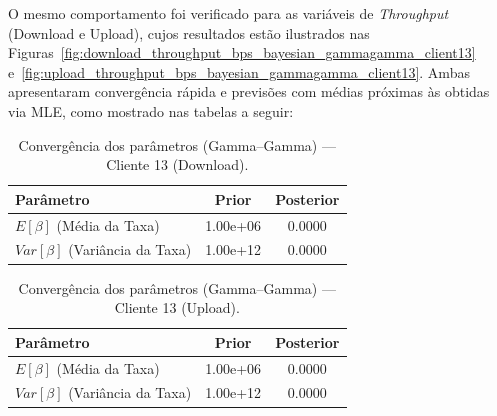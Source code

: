 \documentclass{article}
\begin{document}
O mesmo comportamento foi verificado para as variáveis de \textit{Throughput}
(Download e Upload), cujos resultados estão ilustrados nas
Figuras~\ref{fig:download_throughput_bps_bayesian_gammagamma_client13}
e~\ref{fig:upload_throughput_bps_bayesian_gammagamma_client13}.
Ambas apresentaram convergência rápida e previsões com médias próximas às obtidas via MLE,
como mostrado nas tabelas a seguir:

\begin{table}[htp]
	\centering
	\caption{Convergência dos parâmetros (Gamma–Gamma) — Cliente 13 (Download).}
	\label{tab:bayes_gamma_download_client13}
	\begin{tabular}{lcc}
		\hline
		\textbf{Parâmetro} & \textbf{Prior} & \textbf{Posterior} \\ \hline
		$E[\beta]$ (Média da Taxa) & 1.00e+06 & 0.0000 \\
		$Var[\beta]$ (Variância da Taxa) & 1.00e+12 & 0.0000 \\ \hline
	\end{tabular}
\end{table}

\begin{table}[htp]
	\centering
	\caption{Convergência dos parâmetros (Gamma–Gamma) — Cliente 13 (Upload).}
	\label{tab:bayes_gamma_upload_client13}
	\begin{tabular}{lcc}
		\hline
		\textbf{Parâmetro} & \textbf{Prior} & \textbf{Posterior} \\ \hline
		$E[\beta]$ (Média da Taxa) & 1.00e+06 & 0.0000 \\
		$Var[\beta]$ (Variância da Taxa) & 1.00e+12 & 0.0000 \\ \hline
	\end{tabular}
\end{table}
\end{document}
